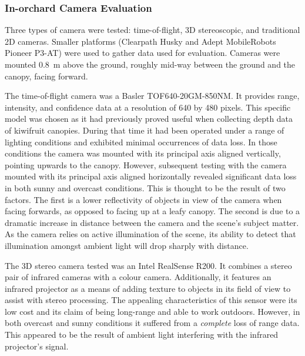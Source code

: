 \documentclass[preprint,authoryear,12pt]{elsarticle}
\begin{document}
    \subsubsection{In-orchard Camera Evaluation}
        \label{sect:camera_evaluation}

        Three types of camera were tested: time-of-flight, 3D stereoscopic, and traditional 2D cameras.
        Smaller platforms (Clearpath Husky and Adept MobileRobots Pioneer P3-AT) were used to gather data used for evaluation.
        Cameras were mounted \SI{0.8}{\meter} above the ground, roughly mid-way between the ground and the canopy, facing forward.

        The time-of-flight camera was a Basler TOF640-20GM-850NM.
        It provides range, intensity, and confidence data at a resolution of 640 by 480 pixels.
        This specific model was chosen as it had previously proved useful when collecting depth data of kiwifruit canopies.
        During that time it had been operated under a range of lighting conditions and exhibited minimal occurrences of data loss.
        In those conditions the camera was mounted with its principal axis aligned vertically, pointing upwards to the canopy.
        However, subsequent testing with the camera mounted with its principal axis aligned horizontally revealed significant data loss in both sunny and overcast conditions.
        This is thought to be the result of two factors.
        The first is a lower reflectivity of objects in view of the camera when facing forwards, as opposed to facing up at a leafy canopy.
        The second is due to a dramatic increase in distance between the camera and the scene's subject matter.
        As the camera relies on active illumination of the scene, its ability to detect that illumination amongst ambient light will drop sharply with distance.

        The 3D stereo camera tested was an Intel RealSense R200.
        It combines a stereo pair of infrared cameras with a colour camera.
        Additionally, it features an infrared projector as a means of adding texture to objects in its field of view to assist with stereo processing.
        The appealing characteristics of this sensor were its low cost and its claim of being long-range and able to work outdoors.
        However, in both overcast and sunny conditions it suffered from a \emph{complete} loss of range data.
        This appeared to be the result of ambient light interfering with the infrared projector’s signal.
\end{document}
